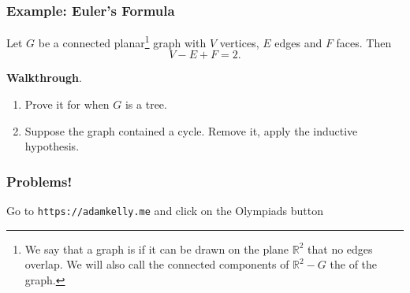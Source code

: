 \documentclass[11pt, mathserif]{beamer}
\theoremstyle{definition}
\theoremstyle{remark}
\begin{document}
\begin{frame}
  \frametitle{Example: Euler's Formula}

  \begin{example}
    Let $G$ be a connected planar\footnote{We say that a graph is  if it can be drawn on the plane $\mathbb{R}^2$ that no edges overlap. We will also call the connected components of $\mathbb{R}^2 - G$ the  of the graph.} graph with $V$ vertices, $E$ edges and $F$ faces. Then
    $$
    V - E + F = 2.
    $$
    \end{example}

\vspace{2\baselineskip}
    \pause
    \textbf{Walkthrough}.
    \begin{enumerate}[<+->]
        \item Prove it for when $G$ is a tree.
        \item Suppose the graph contained a cycle. Remove it, apply the inductive hypothesis. 
    \end{enumerate}
    
\end{frame}

\begin{frame}
  \frametitle{Problems!}

  Go to \texttt{https://adamkelly.me} and click on the Olympiads button

\end{frame}
\end{document}

